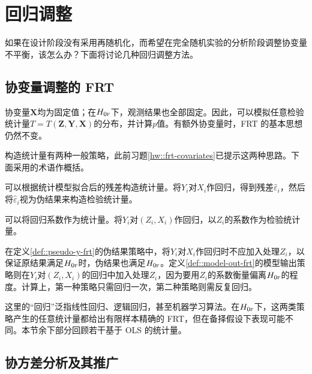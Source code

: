 \section{回归调整}

如果在设计阶段没有采用再随机化，而希望在完全随机实验的分析阶段调整协变量不平衡，该怎么办？下面将讨论几种回归调整方法。

\subsection{协变量调整的 FRT}\label{sec::covariate-adjusted-frt-intro}


协变量$\bm{X}$均为固定值；在$H_{0\textsc{f}}$下，观测结果也全部固定。因此，可以模拟任意检验统计量$T = T(\bm{Z}, \bm{Y}, \bm{X})$的分布，并计算$p$值。有额外协变量时，FRT 的基本思想仍然不变。  


构造统计量有两种一般策略，此前习题\ref{hw::frt-covariates}已提示这两种思路。下面采用\citet{zhao2020caFRT}的术语作概括。 


\begin{definition}
\label{def::pseudo-y-frt}
可以根据统计模型拟合后的残差构造统计量。将$Y_i$对$X_i$作回归，得到残差$\hat \varepsilon_i$，然后将$\hat \varepsilon_i$视为伪结果来构造检验统计量。
\end{definition}



\begin{definition}
\label{def::model-out-frt}
可以将回归系数作为统计量。将$Y_i$对$(Z_i, X_i)$作回归，以$Z_i$的系数作为检验统计量。
\end{definition}

 

在定义\ref{def::pseudo-y-frt}的伪结果策略中，将$Y_i$对$X_i$作回归时不应加入处理$Z_i$，以保证原结果满足$H_{0\textsc{f}}$时，伪结果也满足$H_{0\textsc{f}}$。定义\ref{def::model-out-frt}的模型输出策略则在$Y_i$对$(Z_i, X_i)$的回归中加入处理$Z_i$，因为要用$Z_i$的系数衡量偏离$H_{0\textsc{f}}$的程度。计算上，第一种策略只需回归一次，第二种策略则需反复回归。 

这里的“回归”泛指线性回归、逻辑回归，甚至机器学习算法。在$H_{0\textsc{f}}$下，这两类策略产生的任意统计量都给出有限样本精确的 FRT，但在备择假设下表现可能不同。本节余下部分回顾若干基于 OLS 的统计量。 



\subsection{协方差分析及其推广}\label{sec::ancova}


